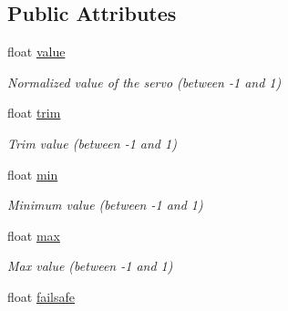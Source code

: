 \subsection*{Public Attributes}
\begin{DoxyCompactItemize}
\item 
\hypertarget{structservo__entry__t_a1bf2071f3ac057595ca9e427ddeb40db}{float \hyperlink{structservo__entry__t_a1bf2071f3ac057595ca9e427ddeb40db}{value}}\label{structservo__entry__t_a1bf2071f3ac057595ca9e427ddeb40db}

\begin{DoxyCompactList}\small\item\em Normalized value of the servo (between -\/1 and 1) \end{DoxyCompactList}\item 
\hypertarget{structservo__entry__t_a9652d21642352a9748e9801060ee2984}{float \hyperlink{structservo__entry__t_a9652d21642352a9748e9801060ee2984}{trim}}\label{structservo__entry__t_a9652d21642352a9748e9801060ee2984}

\begin{DoxyCompactList}\small\item\em Trim value (between -\/1 and 1) \end{DoxyCompactList}\item 
\hypertarget{structservo__entry__t_af754762d20a71de1495123450d177e1d}{float \hyperlink{structservo__entry__t_af754762d20a71de1495123450d177e1d}{min}}\label{structservo__entry__t_af754762d20a71de1495123450d177e1d}

\begin{DoxyCompactList}\small\item\em Minimum value (between -\/1 and 1) \end{DoxyCompactList}\item 
\hypertarget{structservo__entry__t_ac3c22bcc3cb1520721497ad57f5f43ae}{float \hyperlink{structservo__entry__t_ac3c22bcc3cb1520721497ad57f5f43ae}{max}}\label{structservo__entry__t_ac3c22bcc3cb1520721497ad57f5f43ae}

\begin{DoxyCompactList}\small\item\em Max value (between -\/1 and 1) \end{DoxyCompactList}\item 
\hypertarget{structservo__entry__t_a8d1a153a07491eb93aae44c7990eed88}{float \hyperlink{structservo__entry__t_a8d1a153a07491eb93aae44c7990eed88}{failsafe}}\label{structservo__entry__t_a8d1a153a07491eb93aae44c7990eed88}


\end{DoxyCompactItemize}
